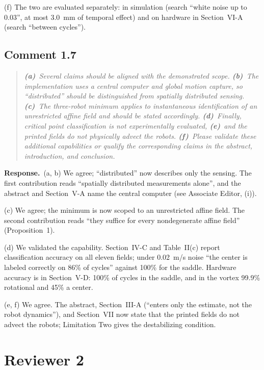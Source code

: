 \documentclass[10pt]{article}
\newcommand{\rev}[1]{#1}                             %
\newcommand{\resp}{\par\textbf{Response.}~}
\begin{document}
(f) The two are evaluated separately: in simulation (search ``white noise up to 0.03'', at most \rev{3.0}~mm of temporal effect) and on hardware in Section~VI-A (search ``between cycles'').

\subsection*{Comment 1.7}

\begin{quote}\itshape
\textbf{(a)}~Several claims should be aligned with the demonstrated scope.
\textbf{(b)}~The implementation uses a central computer and global motion capture, so ``distributed'' should be distinguished from spatially distributed sensing.
\textbf{(c)}~The three-robot minimum applies to instantaneous identification of an unrestricted affine field and should be stated accordingly.
\textbf{(d)}~Finally, critical point classification is not experimentally evaluated,
\textbf{(e)}~and the printed fields do not physically advect the robots.
\textbf{(f)}~Please validate these additional capabilities or qualify the corresponding claims in the abstract, introduction, and conclusion.
\end{quote}

\resp (a, b) We agree; ``distributed'' now describes only the sensing. The first contribution reads ``spatially distributed measurements alone'', and the abstract and Section~V-A name the central computer (see Associate Editor, (i)).

(c) We agree; the minimum is now scoped to an unrestricted affine field. The second contribution reads ``they suffice for every nondegenerate affine field'' (Proposition~1).

(d) We validated the capability. Section~IV-C and Table~II(c) report classification accuracy on all eleven fields; under 0.02~m/s noise ``the center is labeled correctly on \rev{86}\% of cycles'' against \rev{100}\% for the saddle. Hardware accuracy is in Section~V-D: \rev{100}\% of cycles in the saddle, and in the vortex \rev{99.9}\% rotational and \rev{45}\% a center.

(e, f) We agree. The abstract, Section~III-A (``enters only the estimate, not the robot dynamics''), and Section~VII now state that the printed fields do not advect the robots; Limitation Two gives the destabilizing condition.

\section*{Reviewer 2}
\end{document}

